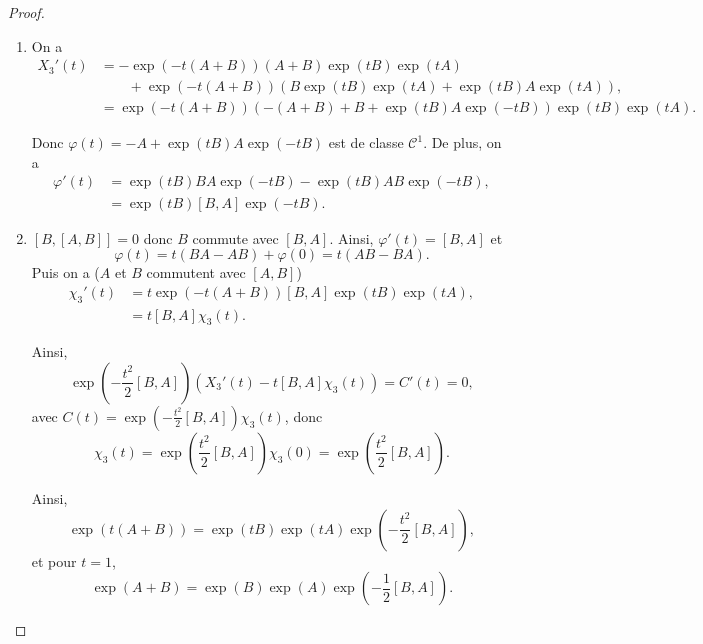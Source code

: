 \documentclass[12pt]{article}
\begin{document}
\begin{proof}
	\phantom{}
	\begin{enumerate}
		\item On a 
		\begin{align*}
			X_3'(t)
			&=-\exp(-t(A+B))(A+B)\exp(tB)\exp(tA)\\
			&\qquad+\exp\left(-t(A+B)\right)\left(B\exp(tB)\exp(tA)+\exp(tB)A\exp(tA)\right)\nonumber,\\
			&=\exp(-t(A+B))\left(-(A+B)+B+\exp(tB)A\exp(-tB)\right)\exp(tB)\exp(tA).
		\end{align*}

		Donc $\varphi(t)=-A+\exp(tB)A\exp(-tB)$ est de classe $\mathcal{C}^{1}$. De plus, on a 
		\begin{align*}
			\varphi'(t)
			&=\exp(tB)BA\exp(-tB)-\exp(tB)AB\exp(-tB),\\
			&=\exp(tB)[B,A]\exp(-tB).
		\end{align*}

		\item $[B,[A,B]]=0$ donc $B$ commute avec $[B,A]$. Ainsi, $\varphi'(t)=[B,A]$ et 
		\begin{equation*}
			\varphi(t)=t(BA-AB)+\varphi(0)=t(AB-BA).
		\end{equation*}
		Puis on a ($A$ et $B$ commutent avec $[A,B]$)
		\begin{align*}
			\chi_{3}'(t)
			&=t\exp(-t(A+B))[B,A]\exp(tB)\exp(tA),\\
			&=t[B,A]\chi_3(t).
		\end{align*}

		Ainsi,
		\begin{equation*}
			\exp\left(-\frac{t^{2}}{2}[B,A]\right)\left(X_3'(t)-t[B,A]\chi_3(t)\right)=C'(t)=0,
		\end{equation*}
		avec $C(t)=\exp\left(-\frac{t^{2}}{2}[B,A]\right)\chi_{3}(t)$, donc 
		\begin{equation*}
			\chi_3(t)=\exp\left(\frac{t^{2}}{2}[B,A]\right)\chi_3(0)=\exp\left(\frac{t^{2}}{2}[B,A]\right).
		\end{equation*}

		Ainsi,
		\begin{equation*}
			\exp\left(t(A+B)\right)=\exp(tB)\exp(tA)\exp\left(-\frac{t^{2}}{2}[B,A]\right),
		\end{equation*}
		et pour $t=1$,
		\begin{equation*}
			\exp(A+B)=\exp(B)\exp(A)\exp\left(-\frac{1}{2}[B,A]\right).
		\end{equation*}
	\end{enumerate}
\end{proof}
\end{document}
